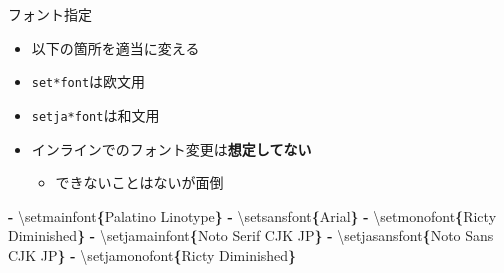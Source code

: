 \documentclass[14pt,ignorenonframetext,]{beamer}
\newenvironment{Shaded}{\begin{snugshade}}{\end{snugshade}}
\newcommand{\KeywordTok}[1]{\textcolor[rgb]{0.13,0.29,0.53}{\textbf{#1}}}
\newcommand{\NormalTok}[1]{#1}
\providecommand{\tightlist}{%
  \setlength{\itemsep}{0pt}\setlength{\parskip}{0pt}}
\begin{document}
\begin{frame}[fragile]{フォント指定}
\protect\hypertarget{ux30d5ux30a9ux30f3ux30c8ux6307ux5b9a}{}

\begin{itemize}
\tightlist
\item
  以下の箇所を適当に変える
\item
  \texttt{set*font}は欧文用
\item
  \texttt{setja*font}は和文用
\item
  インラインでのフォント変更は\textbf{想定してない}

  \begin{itemize}
  \tightlist
  \item
    できないことはないが面倒
  \end{itemize}
\end{itemize}

\begin{Shaded}
\begin{Highlighting}[]
\KeywordTok{-}\NormalTok{ \textbackslash{}setmainfont}\KeywordTok{\{}\NormalTok{Palatino Linotype}\KeywordTok{\}}
\KeywordTok{-}\NormalTok{ \textbackslash{}setsansfont}\KeywordTok{\{}\NormalTok{Arial}\KeywordTok{\}}
\KeywordTok{-}\NormalTok{ \textbackslash{}setmonofont}\KeywordTok{\{}\NormalTok{Ricty Diminished}\KeywordTok{\}}
\KeywordTok{-}\NormalTok{ \textbackslash{}setjamainfont}\KeywordTok{\{}\NormalTok{Noto Serif CJK JP}\KeywordTok{\}}
\KeywordTok{-}\NormalTok{ \textbackslash{}setjasansfont}\KeywordTok{\{}\NormalTok{Noto Sans CJK JP}\KeywordTok{\}}
\KeywordTok{-}\NormalTok{ \textbackslash{}setjamonofont}\KeywordTok{\{}\NormalTok{Ricty Diminished}\KeywordTok{\}}
\end{Highlighting}
\end{Shaded}

\end{frame}
\end{document}

